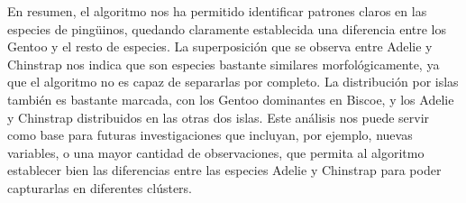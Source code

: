 \documentclass[a4paper,onecolumn]{extarticle}
\begin{document}
\begin{sloppypar}
En resumen, el algoritmo nos ha permitido identificar patrones claros en las especies de pingüinos, quedando claramente establecida una diferencia entre los 
Gentoo y el resto de especies. La superposición que se observa entre Adelie y Chinstrap nos indica que son especies bastante similares morfológicamente, ya 
que el algoritmo no es capaz de separarlas por completo. La distribución por islas también es bastante marcada, con los Gentoo dominantes en Biscoe, y los Adelie 
y Chinstrap distribuidos en las otras dos islas. Este análisis nos puede servir como base para futuras investigaciones que incluyan, por ejemplo, nuevas 
variables, o una mayor cantidad de observaciones, que permita al algoritmo establecer bien las diferencias entre las especies Adelie y Chinstrap para poder 
capturarlas en diferentes clústers.

\end{sloppypar}
\end{document}
